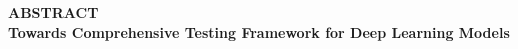 
\begin{center}
{{\fontsize{16}{15} \bf ABSTRACT
		\\ \vspace{0.3cm} \normalfont Towards Comprehensive Testing Framework for Deep Learning Models
		} \\}
\vspace{0.4cm}
\end{center}
\normalsize




\clearpage
\newpage
